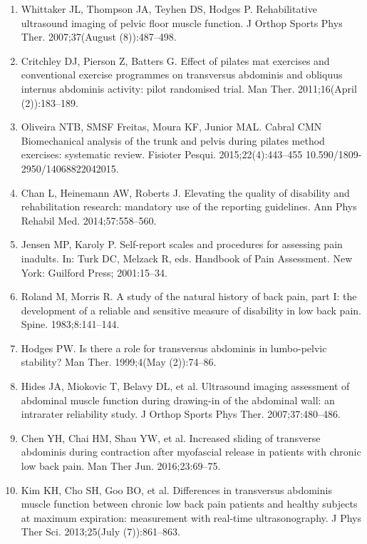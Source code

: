 \documentclass[a5paper]{article}
\theoremstyle{definition}
\begin{document}
\begin{enumerate}
\item
Whittaker JL, Thompson JA, Teyhen DS, Hodges P. Rehabilitative ultrasound imaging
of pelvic floor muscle function. J Orthop Sports Phys Ther. 2007;37(August
(8)):487–498.


\item
Critchley DJ, Pierson Z, Batters G. Effect of pilates mat exercises and conventional
exercise programmes on transversus abdominis and obliquus internus abdominis
activity: pilot randomised trial. Man Ther. 2011;16(April (2)):183–189.


\item
Oliveira NTB, SMSF Freitas, Moura KF, Junior MAL. Cabral CMN Biomechanical
analysis of the trunk and pelvis during pilates method exercises: systematic review.
Fisioter Pesqui. 2015;22(4):443–455 10.590/1809-2950/14068822042015.


\item
Chan L, Heinemann AW, Roberts J. Elevating the quality of disability and rehabilitation research: mandatory use of the reporting guidelines. Ann Phys Rehabil
Med. 2014;57:558–560.


\item
Jensen MP, Karoly P. Self-report scales and procedures for assessing pain inadults. In:
Turk DC, Melzack R, eds. Handbook of Pain Assessment. New York: Guilford Press;
2001:15–34.


\item
Roland M, Morris R. A study of the natural history of back pain, part I: the development of a reliable and sensitive measure of disability in low back pain. Spine.
1983;8:141–144.


\item
Hodges PW. Is there a role for transversus abdominis in lumbo-pelvic stability? Man
Ther. 1999;4(May (2)):74–86.


\item
Hides JA, Miokovic T, Belavy DL, et al. Ultrasound imaging assessment of abdominal
muscle function during drawing-in of the abdominal wall: an intrarater reliability
study. J Orthop Sports Phys Ther. 2007;37:480–486.


\item
Chen YH, Chai HM, Shau YW, et al. Increased sliding of transverse abdominis during
contraction after myofascial release in patients with chronic low back pain. Man Ther
Jun. 2016;23:69–75.


\item
Kim KH, Cho SH, Goo BO, et al. Differences in transversus abdominis muscle function
between chronic low back pain patients and healthy subjects at maximum expiration:
measurement with real-time ultrasonography. J Phys Ther Sci. 2013;25(July
(7)):861–863.



\end{enumerate}
\end{document}
